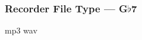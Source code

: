 \subsubsection{Recorder File Type --- \UiKey{\SET}G$\flat$7}









































mp3
wav
